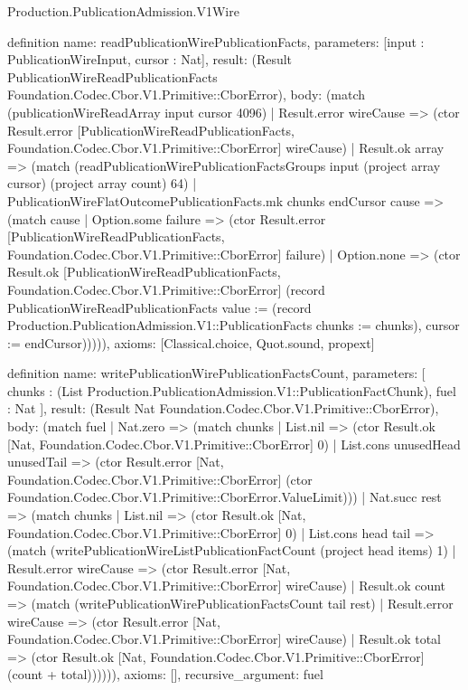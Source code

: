 \begin{lexlean}{Production.PublicationAdmission.V1Wire}
\begin{semanticmodule}
definition{
  name: readPublicationWirePublicationFacts,
  parameters: [input : PublicationWireInput, cursor : Nat],
  result: (Result PublicationWireReadPublicationFacts Foundation.Codec.Cbor.V1.Primitive::CborError),
  body: (match (publicationWireReadArray input cursor 4096)
    | Result.error wireCause => (ctor Result.error [PublicationWireReadPublicationFacts, Foundation.Codec.Cbor.V1.Primitive::CborError] wireCause)
    | Result.ok array => (match (readPublicationWirePublicationFactsGroups input (project array cursor) (project array count) 64)
      | PublicationWireFlatOutcomePublicationFacts.mk chunks endCursor cause => (match cause
        | Option.some failure => (ctor Result.error [PublicationWireReadPublicationFacts, Foundation.Codec.Cbor.V1.Primitive::CborError] failure)
        | Option.none => (ctor Result.ok [PublicationWireReadPublicationFacts, Foundation.Codec.Cbor.V1.Primitive::CborError] (record PublicationWireReadPublicationFacts {value := (record Production.PublicationAdmission.V1::PublicationFacts {chunks := chunks}), cursor := endCursor}))))),
  axioms: [Classical.choice, Quot.sound, propext]
}

definition{
  name: writePublicationWirePublicationFactsCount,
  parameters: [
    chunks : (List Production.PublicationAdmission.V1::PublicationFactChunk),
    fuel : Nat
  ],
  result: (Result Nat Foundation.Codec.Cbor.V1.Primitive::CborError),
  body: (match fuel
    | Nat.zero => (match chunks
      | List.nil => (ctor Result.ok [Nat, Foundation.Codec.Cbor.V1.Primitive::CborError] 0)
      | List.cons unusedHead unusedTail => (ctor Result.error [Nat, Foundation.Codec.Cbor.V1.Primitive::CborError] (ctor Foundation.Codec.Cbor.V1.Primitive::CborError.ValueLimit)))
    | Nat.succ rest => (match chunks
      | List.nil => (ctor Result.ok [Nat, Foundation.Codec.Cbor.V1.Primitive::CborError] 0)
      | List.cons head tail => (match (writePublicationWireListPublicationFactCount (project head items) 1)
        | Result.error wireCause => (ctor Result.error [Nat, Foundation.Codec.Cbor.V1.Primitive::CborError] wireCause)
        | Result.ok count => (match (writePublicationWirePublicationFactsCount tail rest)
          | Result.error wireCause => (ctor Result.error [Nat, Foundation.Codec.Cbor.V1.Primitive::CborError] wireCause)
          | Result.ok total => (ctor Result.ok [Nat, Foundation.Codec.Cbor.V1.Primitive::CborError] (count + total)))))),
  axioms: [],
  recursive_argument: fuel
}


\end{semanticmodule}
\end{lexlean}

